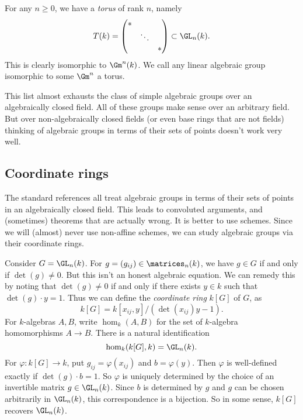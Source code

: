 \begin{example}[Tori]
For any $n\geqslant 0$, we have a \emph{torus} of rank $n$, namely 
\[
  T(k) = \begin{pmatrix} \ast \\ & \ddots \\ & & \ast \end{pmatrix}\subset \GL_n(k) .
\]
This is clearly isomorphic to $\Gm^n(k)$. We call any linear algebraic group 
isomorphic to some $\Gm^n$ a torus.  
\end{example}

This list almost exhausts the class of simple algebraic groups over an 
algebraically closed field. All of these groups make sense over 
an arbitrary field. But over non-algebraically closed fields (or even base 
rings that are not fields) thinking of algebraic groups in terms of their sets 
of points doesn't work very well. 





\subsection{Coordinate rings}

The standard references \cite{borel-1991,humphreys-1975,springer-2009} all treat 
algebraic groups in terms of their sets of points in an algebraically closed 
field. This leads to convoluted arguments, and (sometimes) theorems that are 
actually wrong. It is better to use schemes. Since we will (almost) never use 
non-affine schemes, we can study algebraic groups via their coordinate rings. 

\begin{example}
Consider $G=\GL_n(k)$. For $g=(g_{i j})\in \matrices_n(k)$, we have 
$g\in G$ if and only if $\det(g)\ne 0$. But this isn't an honest algebraic 
equation. We can remedy this by noting that $\det(g)\ne 0$ if and only if 
there exists $y\in k$ such that $\det(g)\cdot y=1$. Thus we can define the 
\emph{coordinate ring} $k[G]$ of $G$, as 
\[
  k[G] = k[x_{i j},y] / (\det(x_{i j})y-1) .
\]
For $k$-algebras $A,B$, write $\hom_k(A,B)$ for the set of $k$-algebra 
homomorphisms $A\to B$. There is a natural identification 
\[
  \hom_k(k[G],k) = \GL_n(k) .
\]
For $\varphi:k[G]\to k$, put $g_{i j} = \varphi(x_{i j})$ and 
$b=\varphi(y)$. Then $\varphi$ is well-defined exactly if 
$\det(g)\cdot b=1$. So $\varphi$ is uniquely determined by the choice of an 
invertible matrix $g\in \GL_n(k)$. Since $b$ is determined by $g$ and $g$ can 
be chosen arbitrarily in $\GL_n(k)$, this correspondence is a bijection. So in 
some sense, $k[G]$ recovers $\GL_n(k)$. 
\end{example}

